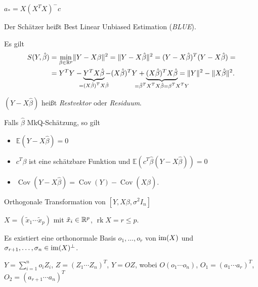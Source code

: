 \documentclass{cheat-sheet}
\newcommand{\E}{\mathbb{E}} %
\DeclareMathOperator{\rk}{rk} %
\DeclareMathOperator{\cov}{Cov} %
\begin{document}
\begin{konstr}
  $a_* = X (X^T X)^{-} c$
\end{konstr}

\begin{defn}
  Der Schätzer heißt Best Linear Unbiased Estimation (\emph{BLUE}).
\end{defn}


\begin{bem}
  Es gilt
  \begin{align*}
    S(Y, \hat{\beta}) & = \min_{\beta \in \R^p} \norm{Y - X \beta}^2 = \norm{Y - X \hat{\beta}}^2 = (Y - X \hat{\beta})^T (Y - X \hat{\beta}) = \\
    & = Y^T Y - \underbrace{Y^T X \hat{\beta}}_{\mathclap{= (X \hat{\beta})^T X \hat{\beta}}} - (X \hat{\beta})^T Y + \underbrace{(X \hat{\beta})^T X \hat{\beta}}_{\mathclap{= \hat{\beta}^T X^T X \hat{\beta} = \beta^T X^T Y}} = \norm{Y}^2 - \norm{X \hat{\beta}}^2.
  \end{align*}
\end{bem}

\begin{defn}
  $(Y - X \hat{\beta})$ \enspace
  heißt \emph{Restvektor} oder \emph{Residuum}.
\end{defn}

\begin{lem}
  Falls $\hat{\beta}$ MkQ-Schätzung, so gilt
  \begin{itemize}
    \item $\E (Y - X \hat\beta) = 0$
    \item $c^T \beta$ ist eine schätzbare Funktion und $\E (c^T \hat{\beta} (Y - X \hat\beta)) = 0$
    \item $\cov(Y - X \hat\beta) = \cov(Y) - \cov(X \hat\beta)$.
  \end{itemize}
\end{lem}

Orthogonale Transformation von $[Y, X \beta, \sigma^2 I_n]$

$X = (\tilde{x}_1 \cdots \tilde{x}_p)$ mit $\tilde{x}_i \in \mathbb{R}^p$, $\rk X = r \leq p$.

Es existiert eine orthonormale Basis $o_1, \ldots, o_r$ von $\operatorname{im}(X)$ und $\sigma_{r+1}, \ldots, \sigma_n \in \operatorname{im}(X)^\perp$.

$Y = \sum_{i=1}^n o_i Z_i$, $Z = (Z_1 \cdots Z_n)^T$, \dh{} $Y = O Z$, wobei $O (o_1 \cdots o_n)$, $O_1 = (a_1 \cdots a_r)^T$, $O_2 = (a_{r+1} \cdots a_n)^T$
\end{document}
